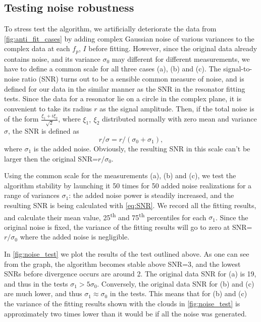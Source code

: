 \documentclass[%
 aip,
 draft,
 amsmath,amssymb,
 reprint,%
]{revtex4-1}
\begin{document}
\subsection{Testing noise robustness}

To stress test the algorithm, we artificially deteriorate the data from \autoref{fig:anti_fit_cases} by adding complex Gaussian noise of various variances to the complex data at each $f_p$, $I$ before fitting. However, since the original data already contains noise, and its variance $\sigma_0$ may different for different measurements, we have to define a common scale for all three cases (a), (b) and (c). The signal-to-noise ratio (SNR) turns out to be a sensible common measure of noise, and is defined for our data in the similar manner as the SNR in the resonator fitting tests\cite{probst2015}. Since the data for a resonator lie on a circle in the complex plane, it is convenient to take its radius $r$ as the signal amplitude. Then, if the total noise is of the form $\frac{\xi_1+i\xi_2}{\sqrt 2}$, where $\xi_1,\ \xi_2$ distributed normally with zero mean and variance $\sigma$, the SNR is defined as 
\begin{equation}
r/\sigma = r/(\sigma_0+\sigma_1),
\label{eq:SNR}
\end{equation}
where $\sigma_1$ is the added noise. Obviously, the resulting SNR in this scale can't be larger then the original SNR=$r/\sigma_0$. 

Using the common scale for the measurements (a), (b) and (c), we test the algorithm stability by launching it 50 times for 50 added noise realizations for a range of variances $\sigma_1$: the added noise power is steadily increased, and the resulting SNR is being calculated with \eqref{eq:SNR}. We record all the fitting results, and calculate their mean value, 25\textsuperscript{th} and 75\textsuperscript{th} percentiles for each $\sigma_1$.  Since the original noise is fixed, the variance of the fitting results will go to zero at SNR=$ r/\sigma_0 $ where the added noise is negligible. 

In \autoref{fig:noise_test} we plot the results of the test outlined above. As one can see from the graph, the algorithm becomes stable above SNR=3, and the lowest SNRs before divergence occurs are around 2. The original data SNR for (a) is 19, and thus in the tests $\sigma_1 > 5\sigma_0$. Conversely, the original data SNR for (b) and (c) are much lower, and thus $\sigma_1 \approx \sigma_0$ in the tests. This means that for (b) and (c) the variance of the fitting results shown with the clouds in \autoref{fig:noise_test} is approximately two times lower than it would be if all the noise was generated.
\end{document}
